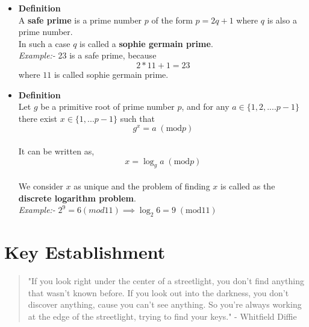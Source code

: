 \documentclass[12pt]{article}
\begin{document}
            \begin{itemize}
               \item \textbf{Definition}\\
               A \textbf{safe prime} is a prime number $p$ of the form $p=2q+1$ where $q$ is also a prime number. \\
               In such a case $q$ is called a \textbf{sophie germain prime}\cite{Stiglic2005}.\\
               \vspace{5mm}
               \textit{Example:-} 23 is a safe prime, because\\
               $$2*11+1=23$$
               where $11$ is called sophie germain prime.
			    \item \textbf{Definition}\\
			    Let $g$ be a primitive root of prime number $p$, and for any $a\in \{1,2,....p-1\}$ there exist $x \in \{1,...p-1\} $ such that 
			    $$ g^x = a \;(\text{mod} p)$$\\
			    It can be written as, $$x = \log_g a \;(\text{mod} p)$$\\
			    We consider $x$ as unique and the problem of finding $x$ is called as the \textbf{discrete logarithm problem}.\\
			    \vspace{2mm}
			    \textit{Example:-} $2^9 = 6(mod 11) \implies \log_2 6= 9 \;(\text{mod} 11)$
			  
            \end{itemize}
 
\section{Key Establishment}

        \begin{quote}
           "If you look right under the center of a streetlight, you don't find anything that wasn't known before.
	  	   If you look out into the darkness, you don't discover anything, cause you can't see anything. 
		    So you're always working at the edge of the streetlight, trying to find your keys."
		          - Whitfield Diffie \cite{stamp2007applied}
 \end{quote}  
\end{document}
